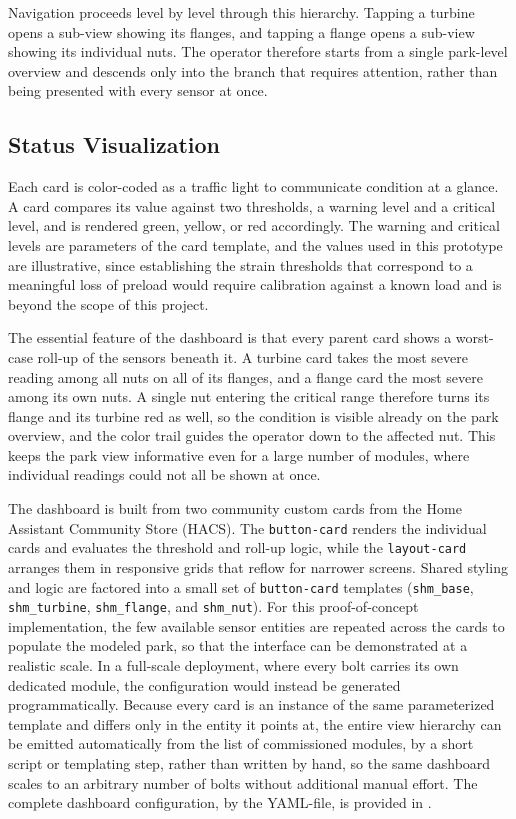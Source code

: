 Navigation proceeds level by level through this hierarchy. Tapping a turbine opens a sub-view showing its flanges, and tapping a flange opens a sub-view showing its individual nuts. The operator therefore starts from a single park-level overview and descends only into the branch that requires attention, rather than being presented with every sensor at once.

\subsection{Status Visualization}
Each card is color-coded as a traffic light to communicate condition at a glance. A card compares its value against two thresholds, a warning level and a critical level, and is rendered green, yellow, or red accordingly. The warning and critical levels are parameters of the card template, and the values used in this prototype are illustrative, since establishing the strain thresholds that correspond to a meaningful loss of preload would require calibration against a known load and is beyond the scope of this project.

The essential feature of the dashboard is that every parent card shows a worst-case roll-up of the sensors beneath it. A turbine card takes the most severe reading among all nuts on all of its flanges, and a flange card the most severe among its own nuts. A single nut entering the critical range therefore turns its flange and its turbine red as well, so the condition is visible already on the park overview, and the color trail guides the operator down to the affected nut. This keeps the park view informative even for a large number of modules, where individual readings could not all be shown at once.

The dashboard is built from two community custom cards from the Home Assistant Community Store (HACS). The \texttt{button-card} renders the individual cards and evaluates the threshold and roll-up logic, while the \texttt{layout-card} arranges them in responsive grids that reflow for narrower screens. Shared styling and logic are factored into a small set of \texttt{button-card} templates (\texttt{shm\_base}, \texttt{shm\_turbine}, \texttt{shm\_flange}, and \texttt{shm\_nut}). 
For this proof-of-concept implementation, the few available sensor entities are repeated across the cards to populate the modeled park, so that the interface can be demonstrated at a realistic scale.
In a full-scale deployment, where every bolt carries its own dedicated module, the configuration would instead be generated programmatically. Because every card is an instance of the same parameterized template and differs only in the entity it points at, the entire view hierarchy can be emitted automatically from the list of commissioned modules, by a short script or templating step, rather than written by hand, so the same dashboard scales to an arbitrary number of bolts without additional manual effort.
The complete dashboard configuration, by the YAML-file, is provided in .

